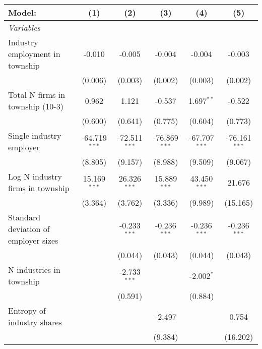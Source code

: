\begingroup
\centering
\begin{tabular}{lccccc}
   \tabularnewline \midrule \midrule
   Model:                               & (1)             & (2)             & (3)             & (4)             & (5)\\  
   \midrule
   \emph{Variables}\\
   Industry employment in township      & -0.010          & -0.005          & -0.004          & -0.004          & -0.003\\   
                                        & (0.006)         & (0.003)         & (0.002)         & (0.003)         & (0.002)\\   
   Total N firms in township (10-3)     & 0.962           & 1.121           & -0.537          & 1.697$^{**}$    & -0.522\\   
                                        & (0.600)         & (0.641)         & (0.775)         & (0.604)         & (0.773)\\   
   Single industry employer             & -64.719$^{***}$ & -72.511$^{***}$ & -76.869$^{***}$ & -67.707$^{***}$ & -76.161$^{***}$\\   
                                        & (8.805)         & (9.157)         & (8.988)         & (9.509)         & (9.067)\\   
   Log N industry firms in township     & 15.169$^{***}$  & 26.326$^{***}$  & 15.889$^{***}$  & 43.450$^{***}$  & 21.676\\   
                                        & (3.364)         & (3.762)         & (3.336)         & (9.989)         & (15.165)\\   
   Standard deviation of employer sizes &                 & -0.233$^{***}$  & -0.236$^{***}$  & -0.236$^{***}$  & -0.236$^{***}$\\   
                                        &                 & (0.044)         & (0.043)         & (0.044)         & (0.043)\\   
   N industries in township             &                 & -2.733$^{***}$  &                 & -2.002$^{*}$    &   \\   
                                        &                 & (0.591)         &                 & (0.884)         &   \\   
   Entropy of industry shares           &                 &                 & -2.497          &                 & 0.754\\   
                                        &                 &                 & (9.384)         &                 & (16.202)\\   

\end{tabular}

